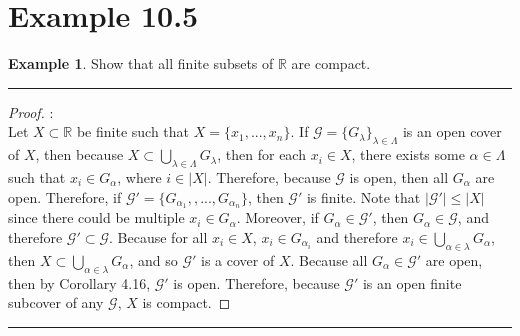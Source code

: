 \documentclass[openany, amssymb, psamsfonts]{amsart}
\newcommand{\bbR}{\mathbb{R}}
\theoremstyle{definition}
\newtheorem{exmp}{Example}[section]
\numberwithin{equation}{section}
\begin{document}
\section*{Example 10.5}
\begin{exmp}
\label{10.5}
Show that all finite subsets of $\bbR$ are compact.
\end{exmp} 
 \vspace{4pt}     \hrule   \vspace{4pt} \begin{proof}:\\
Let $X\subset \bbR$ be finite such that $X = \{x_1,...,x_n\}$. If $\mathcal{G} = \{G_\lambda\}_{\lambda \in \Lambda}$ is an open cover of $X$, then because $X\subset \bigcup_{\lambda \in \Lambda}G_\lambda$, then for each $x_i\in X$, there exists some $\alpha\in \Lambda$ such that $x_i\in G_\alpha$, where $i\in |X|$. Therefore, because $\mathcal{G}$ is open, then all $G_\alpha$ are open. Therefore, if $\mathcal{G'} = \{G_{\alpha_1},, ..., G_{\alpha_n}\}$, then $\mathcal{G'}$ is finite. Note that $|\mathcal{G}'|\leq |X|$ since there could be multiple $x_i\in G_\alpha$. Moreover, if $G_\alpha \in \mathcal{G}'$, then $G_\alpha \in \mathcal{G}$, and therefore $\mathcal{G}'\subset \mathcal{G}$. Because for all $x_i\in X $, $x_i\in G_{\alpha_i}$ and therefore $x_i\in \bigcup_{\alpha\in \lambda}G_\alpha$, then $X\subset \bigcup_{\alpha\in \lambda}G_\alpha$, and so $\mathcal{G'}$ is a cover of $X$. Because all $G_\alpha \in \mathcal{G'}$ are open, then by Corollary 4.16, $\mathcal{G'}$ is open. Therefore, because $\mathcal{G'}$ is an open finite subcover of any $\mathcal{G}$, $X$ is compact.
\end{proof} \vspace{4pt}     \hrule   \vspace{4pt}
\end{document}
